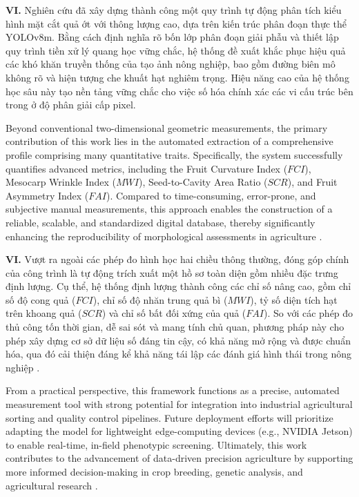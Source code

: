 \documentclass[final,1p,11pt,longtitle]{elsarticle}
\newenvironment{viet}{\par\smallskip\begingroup\color{viColor}\noindent\textbf{VI. }\ignorespaces}{\par\endgroup\smallskip}
\begin{document}
\begin{viet}
Nghiên cứu đã xây dựng thành công một quy trình tự động phân tích kiểu hình mặt cắt quả ớt với thông lượng cao, dựa trên kiến trúc phân đoạn thực thể YOLOv8m. Bằng cách định nghĩa rõ bốn lớp phân đoạn giải phẫu và thiết lập quy trình tiền xử lý quang học vững chắc, hệ thống đề xuất khắc phục hiệu quả các khó khăn truyền thống của tạo ảnh nông nghiệp, bao gồm đường biên mô không rõ và hiện tượng che khuất hạt nghiêm trọng. Hiệu năng cao của hệ thống học sâu này tạo nền tảng vững chắc cho việc số hóa chính xác các vi cấu trúc bên trong ở độ phân giải cấp pixel.
\end{viet}


Beyond conventional two-dimensional geometric measurements, the primary contribution of this work lies in the automated extraction of a comprehensive profile comprising many quantitative traits. Specifically, the system successfully quantifies advanced metrics, including the Fruit Curvature Index ($FCI$), Mesocarp Wrinkle Index ($MWI$), Seed-to-Cavity Area Ratio ($SCR$), and Fruit Asymmetry Index ($FAI$). Compared to time-consuming, error-prone, and subjective manual measurements, this approach enables the construction of a reliable, scalable, and standardized digital database, thereby significantly enhancing the reproducibility of morphological assessments in agriculture \cite{gedil}.

\begin{viet}
Vượt ra ngoài các phép đo hình học hai chiều thông thường, đóng góp chính của công trình là tự động trích xuất một hồ sơ toàn diện gồm nhiều đặc trưng định lượng. Cụ thể, hệ thống định lượng thành công các chỉ số nâng cao, gồm chỉ số độ cong quả ($FCI$), chỉ số độ nhăn trung quả bì ($MWI$), tỷ số diện tích hạt trên khoang quả ($SCR$) và chỉ số bất đối xứng của quả ($FAI$). So với các phép đo thủ công tốn thời gian, dễ sai sót và mang tính chủ quan, phương pháp này cho phép xây dựng cơ sở dữ liệu số đáng tin cậy, có khả năng mở rộng và được chuẩn hóa, qua đó cải thiện đáng kể khả năng tái lập các đánh giá hình thái trong nông nghiệp \cite{gedil}.
\end{viet}


From a practical perspective, this framework functions as a precise, automated measurement tool with strong potential for integration into industrial agricultural sorting and quality control pipelines. Future deployment efforts will prioritize adapting the model for lightweight edge-computing devices (e.g., NVIDIA Jetson) to enable real-time, in-field phenotypic screening. Ultimately, this work contributes to the advancement of data-driven precision agriculture by supporting more informed decision-making in crop breeding, genetic analysis, and agricultural research \cite{next}.
\end{document}

